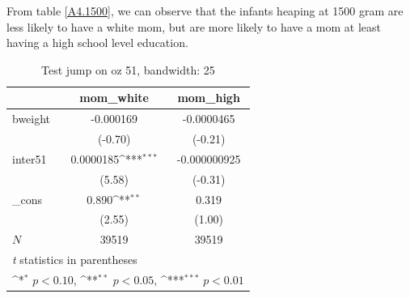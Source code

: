 \documentclass[a4paper,11pt]{article}
\begin{document}
From table \ref{A4.1500}, we can observe that the infants heaping at 1500 gram are less likely to have a white mom, but are more likely to have a mom at least having a high school level education.


\begin{table}[htbp]\centering
\def\sym#1{\ifmmode^{#1}\else\(^{#1}\)\fi}
\caption{Test jump on oz 51, bandwidth: 25}
\label{A4.oz51}
\begin{tabular}{l*{2}{c}}
\hline\hline
            &\multicolumn{1}{c}{mom\_white}&\multicolumn{1}{c}{mom\_high}\\
\hline
bweight     &   -0.000169         &  -0.0000465         \\
            &     (-0.70)         &     (-0.21)         \\
[1em]
inter51     &   0.0000185\sym{***}&-0.000000925         \\
            &      (5.58)         &     (-0.31)         \\
[1em]
\_cons      &       0.890\sym{**} &       0.319         \\
            &      (2.55)         &      (1.00)         \\
\hline
\(N\)       &       39519         &       39519         \\
\hline\hline
\multicolumn{3}{l}{\footnotesize \textit{t} statistics in parentheses}\\
\multicolumn{3}{l}{\footnotesize \sym{*} \(p<0.10\), \sym{**} \(p<0.05\), \sym{***} \(p<0.01\)}\\
\end{tabular}
\end{table}


\end{document}
